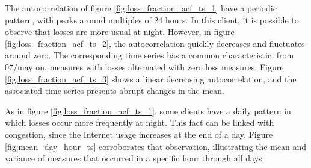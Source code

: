The autocorrelation of figure \ref{fig:loss_fraction_acf_ts_1} have a periodic pattern, with peaks around multiples of 24 hours. In this client, it is possible to observe that losses are more usual at night. However, in figure \ref{fig:loss_fraction_acf_ts_2}, the autocorrelation quickly decreases and fluctuates around zero. The corresponding time series has a common characteristic, from 07/may on, measures with losses alternated with zero loss measures. Figure \ref{fig:loss_fraction_acf_ts_3} shows a linear decreasing autocorrelation, and the associated time series presents abrupt changes in the mean. 

As in figure \ref{fig:loss_fraction_acf_ts_1}, some clients have a daily pattern in which losses occur more frequently at night. This fact can be linked with congestion, since the Internet usage increases at the end of a day. Figure \ref{fig:mean_day_hour_ts} corroborates that observation, illustrating the mean and variance of measures that occurred in a specific hour through all days. 


